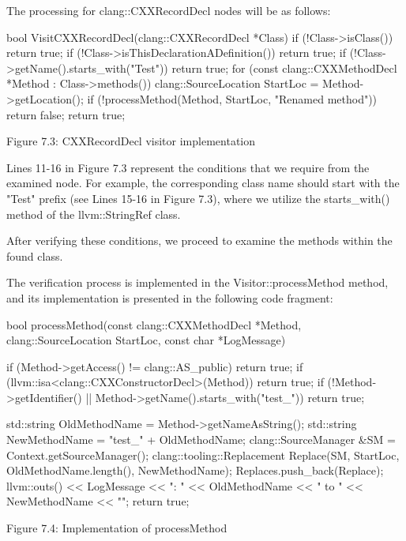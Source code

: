 The processing for clang::CXXRecordDecl nodes will be as follows:

\begin{cpp}
bool VisitCXXRecordDecl(clang::CXXRecordDecl *Class) {
  if (!Class->isClass())
    return true;
  if (!Class->isThisDeclarationADefinition())
    return true;
  if (!Class->getName().starts_with("Test"))
    return true;
  for (const clang::CXXMethodDecl *Method : Class->methods()) {
    clang::SourceLocation StartLoc = Method->getLocation();
    if (!processMethod(Method, StartLoc, "Renamed method"))
      return false;
  }
  return true;
}
\end{cpp}

\begin{center}
Figure 7.3: CXXRecordDecl visitor implementation
\end{center}

Lines 11-16 in Figure 7.3 represent the conditions that we require from the examined node. For example, the corresponding class name should start with the "Test" prefix (see Lines 15-16 in Figure 7.3), where we utilize the starts\_with() method of the llvm::StringRef class.

After verifying these conditions, we proceed to examine the methods within the found class.

The verification process is implemented in the Visitor::processMethod method, and its implementation is presented in the following code fragment:

\begin{cpp}
bool processMethod(const clang::CXXMethodDecl *Method,
                   clang::SourceLocation StartLoc, const char *LogMessage) {
  if (Method->getAccess() != clang::AS_public)
    return true;
  if (llvm::isa<clang::CXXConstructorDecl>(Method))
    return true;
  if (!Method->getIdentifier() || Method->getName().starts_with("test_"))
    return true;

  std::string OldMethodName = Method->getNameAsString();
  std::string NewMethodName = "test_" + OldMethodName;
  clang::SourceManager &SM = Context.getSourceManager();
  clang::tooling::Replacement Replace(SM, StartLoc, OldMethodName.length(),
                                      NewMethodName);
  Replaces.push_back(Replace);
  llvm::outs() << LogMessage << ": " << OldMethodName << " to "
               << NewMethodName << "\n";
  return true;
}
\end{cpp}

\begin{center}
Figure 7.4: Implementation of processMethod
\end{center}

